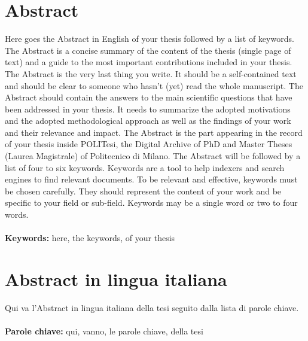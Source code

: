 \documentclass{Configuration_Files/PoliMi3i_thesis}
\begin{document}
\chapter*{Abstract} 
Here goes the Abstract in English of your thesis followed by a list of keywords.
The Abstract is a concise summary of the content of the thesis (single page of text)
and a guide to the most important contributions included in your thesis.
The Abstract is the very last thing you write.
It should be a self-contained text and should be clear to someone who hasn't (yet) read the whole manuscript.
The Abstract should contain the answers to the main scientific questions that have been addressed in your thesis.
It needs to summarize the adopted motivations and the adopted methodological approach as well as the findings of your work and their relevance and impact.
The Abstract is the part appearing in the record of your thesis inside POLITesi,
the Digital Archive of PhD and Master Theses (Laurea Magistrale) of Politecnico di Milano.
The Abstract will be followed by a list of four to six keywords.
Keywords are a tool to help indexers and search engines to find relevant documents.
To be relevant and effective, keywords must be chosen carefully.
They should represent the content of your work and be specific to your field or sub-field.
Keywords may be a single word or two to four words. 
\\
\\
\textbf{Keywords:} here, the keywords, of your thesis %

\chapter*{Abstract in lingua italiana}
Qui va l'Abstract in lingua italiana della tesi seguito dalla lista di parole chiave.
\\
\\
\textbf{Parole chiave:} qui, vanno, le parole chiave, della tesi %


\thispagestyle{empty}
\tableofcontents %
\thispagestyle{empty}
\cleardoublepage
\end{document}
